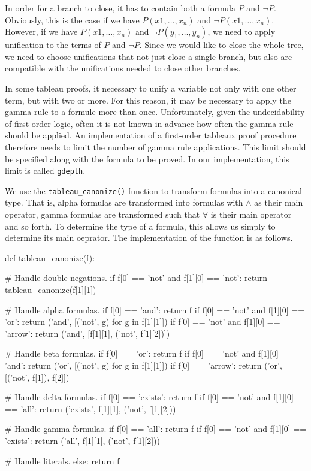 \documentclass[a4paper,notitlepage]{scrartcl}
\begin{document}
In order for a branch to close, it has to contain both a formula $P$ and $\lnot
P$. Obviously, this is the case if we have $P(x1, \ldots, x_n)$ and $\lnot
P(x1, \ldots, x_n)$. However, if we have $P(x1, \ldots, x_n)$ and $\lnot P(y_1,
\ldots, y_n)$, we need to apply unification to the terms of $P$ and $\lnot P$.
Since we would like to close the whole tree, we need to choose unifications
that not just close a single branch, but also are compatible with the
unifications needed to close other branches.

In some tableau proofs, it necessary to unify a variable not only with one
other term, but with two or more. For this reason, it may be necessary to apply
the gamma rule to a formule more than once. Unfortunately, given the
undecidability of first-order logic, often it is not known in advance how often
the gamma rule should be applied. An implementation of a first-order tableaux
proof procedure therefore needs to limit the number of gamma rule applications.
This limit should be specified along with the formula to be proved. In our
implementation, this limit is called \texttt{gdepth}.

We use the \texttt{tableau\_canonize()} function to transform formulas into a
canonical type. That is, alpha formulas are transformed into formulas with
$\land$ as their main operator, gamma formulas are transformed such that
$\forall$ is their main operator and so forth. To determine the type of a
formula, this allows us simply to determine its main oeprator. The
implementation of the function is as follows.

\begin{code}
def tableau_canonize(f):

    # Handle double negations.
    if f[0] == 'not' and f[1][0] == 'not':
        return tableau_canonize(f[1][1])

    # Handle alpha formulas.
    if f[0] == 'and':
        return f 
    if f[0] == 'not' and f[1][0] == 'or':
        return ('and', [('not', g) for g in f[1][1]])
    if f[0] == 'not' and f[1][0] == 'arrow':
        return ('and', [f[1][1], ('not', f[1][2])])

    # Handle beta formulas.
    if f[0] == 'or':
        return f 
    if f[0] == 'not' and f[1][0] == 'and':
        return ('or', [('not', g) for g in f[1][1]])
    if f[0] == 'arrow':
        return ('or', [('not', f[1]), f[2]])

    # Handle delta formulas.
    if f[0] == 'exists':
        return f 
    if f[0] == 'not' and f[1][0] == 'all':
        return ('exists', f[1][1], ('not', f[1][2]))

    # Handle gamma formulas.
    if f[0] == 'all':
        return f
    if f[0] == 'not' and f[1][0] == 'exists':
        return ('all', f[1][1], ('not', f[1][2]))

    # Handle literals. 
    else:
        return f 
\end{code}
\end{document}
